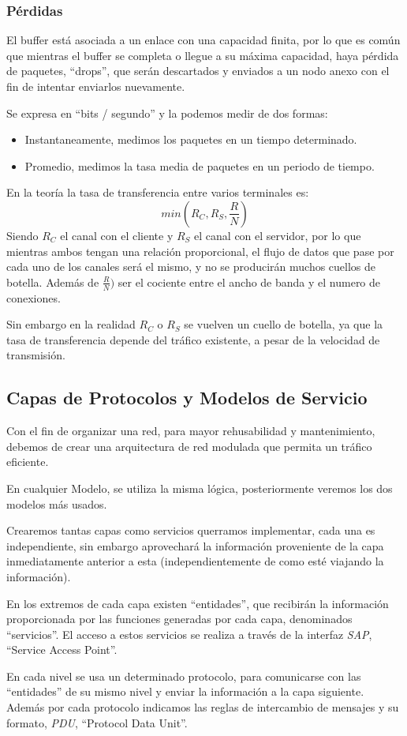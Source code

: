 \subsubsection{Pérdidas}
\noindent El buffer está asociada a un enlace con una capacidad finita, por lo que es común que mientras el buffer se completa o llegue a su máxima capacidad, haya pérdida de paquetes, ``drops'', que serán descartados y enviados a un nodo anexo con el fin de intentar enviarlos nuevamente.
\par \vspace{.5cm}
\noindent Se expresa en ``bits / segundo'' y la podemos medir de dos formas:
\begin{itemize}
        \item Instantaneamente, medimos los paquetes en un tiempo determinado.
        \item Promedio, medimos la tasa media de paquetes en un periodo de tiempo.
\end{itemize}
\noindent En la teoría la tasa de transferencia entre varios terminales es:
\[
        \boxed{min(R_C,R_S, \frac{R}{N})}
\]
\noindent Siendo \(R_C\) el canal con el cliente y \(R_S\) el canal con el servidor, por lo que mientras ambos tengan una relación proporcional, el flujo de datos que pase por cada uno de los canales será el mismo, y no se producirán muchos cuellos de botella. Además de \(\frac{R}{N})\) ser el cociente entre el ancho de banda y el numero de conexiones.\par
\noindent Sin embargo en la realidad \(R_C\) o \(R_S\) se vuelven un cuello de botella, ya que la tasa de transferencia depende del tráfico existente, a pesar de la velocidad de transmisión.
\subsection{Capas de Protocolos y Modelos de Servicio}
\noindent Con el fin de organizar una red, para mayor rehusabilidad y mantenimiento, debemos de crear una arquitectura de red modulada que permita un tráfico eficiente.
\par \vspace{.5cm}
\noindent En cualquier Modelo, se utiliza la misma lógica, posteriormente veremos los dos modelos más usados. \par \noindent Crearemos tantas capas como servicios querramos implementar, cada una es independiente, sin embargo aprovechará la información proveniente de la capa inmediatamente anterior a esta (independientemente de como esté viajando la información).
\par \noindent En los extremos de cada capa existen ``entidades'', que recibirán la información proporcionada por las funciones generadas por cada capa, denominados ``servicios''. El acceso a estos servicios se realiza a través de la interfaz \textit{SAP}, ``Service Access Point''.
\par \noindent En cada nivel se usa un determinado protocolo, para comunicarse con las ``entidades'' de su mismo nivel y enviar la información a la capa siguiente. Además por cada protocolo indicamos las reglas de intercambio de mensajes y su formato, \textit{PDU}, ``Protocol Data Unit''.
